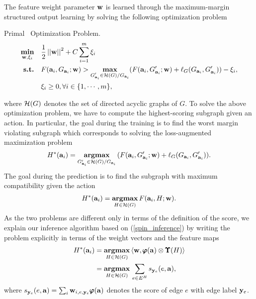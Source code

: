 {%
The feature weight parameter $\mathbf {w}$ is learned through the maximum-margin structured output learning by solving the following optimization problem
\begin{definition}{Primal \spin\ Optimization Problem.}
\begin{align*}
	\underset{\mathbf {w},\mathbf{\xi}_i}{\textbf{min}} &\quad \frac{1}{2}\left|\left| \mathbf {w} \right|\right|^2+C\sum_{i=1}^{m}\xi_i\\
	\textbf{s.t.} &\quad F(\mathbf {a}_i,G_{\mathbf {a}_i};\mathbf {w}) > \underset{\substack{G_{\mathbf {a}_i}'\in\mathcal{H}(G)/G_{\mathbf {a}_i}}}{\textbf{max}}(F(\mathbf {a}_i,G_{\mathbf {a}_i}';\mathbf {w})+\mathbf {\ell}_{G}(G_{\mathbf {a}_i},G_{\mathbf {a}_i}')) - \xi_i,\\
	&\quad \xi_i\ge0, \forall i\in\{1,\cdots,m\},
\end{align*}
\end{definition}
\noindent
where $\mathcal{H}(G)$ denotes the set of directed acyclic graphs of $G$.
To solve the above optimization problem, we have to compute the highest-scoring subgraph given an action. 
In particular, the goal during the training is to find the worst margin violating subgraph which corresponds to solving the loss-augmented maximization problem
\begin{align*}
	H^*(\mathbf {a}_i) = \underset{G_{\mathbf {a}_i}'\in\mathcal{H}(G)/G_{\mathbf {a}_i}}{\textbf{argmax}}\, (F(\mathbf {a}_i,G_{\mathbf {a}_i}';\mathbf {w})+\mathbf {\ell}_{G}(G_{\mathbf {a}_i},G_{\mathbf {a}_i}')).
\end{align*}
The goal during the prediction is to find the subgraph with maximum compatibility given the action
\begin{align}
	H^*(\mathbf {a}_i) = \underset{H\in\mathcal{H}(G)}{\textbf{argmax}}\, F(\mathbf {a}_i,H;\mathbf {w}) \label{spin_inference}.
\end{align}
As the two problems are different only in terms of the definition of the score, we explain our inference algorithm based on (\ref{spin_inference}) by writing the problem explicitly in terms of the weight vectors and the feature maps
\begin{align}
	H^*(\mathbf {a}_i) &= \underset{H\in\mathcal{H}(G)}{\textbf{argmax}}\, \langle \mathbf {w}, \pmb \varphi(\mathbf {a})\otimes\pmb \Upsilon(H) \rangle \nonumber \\
	&= \underset{H\in\mathcal{H}(G)}{\textbf{argmax}}\, \sum_{e\in E^H}s_{\mathbf {y}_e}(e,\mathbf {a}), \label{spin_np}
\end{align}
where $s_{\mathbf {y}_e}(e,\mathbf {a}) = \sum_{i}\mathbf {w}_{i,e,\mathbf {y}_e}\pmb \varphi(\mathbf {a})$ denotes the score of edge $e$ with edge label $\mathbf {y}_e$.

}
